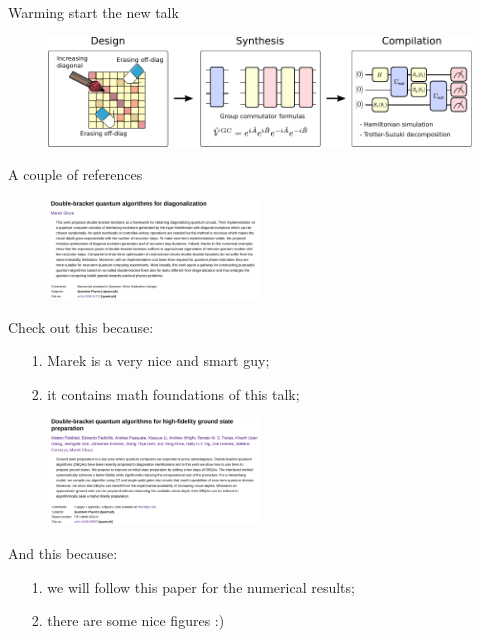 \documentclass[aspectratio=169, 8pt, xcolor={svgnames}]{beamer}
\begin{document}
\begin{frame}{Warming start the new talk}
\begin{figure}
   \includegraphics[width=1\textwidth]{figures/3_phases_dbqa.pdf}
\end{figure}
\end{frame}

\subtitle{\texttt{PART 2:} Interfacing DBQAs with other techniques}
\date{4 December 2024}

\begin{frame}{}
\maketitle
\end{frame}

\begin{frame}{A couple of references}
\begin{multicols}{2}
\begin{figure}
   \includegraphics[width=0.5\textwidth]{figures/dbqa_paper.png}
\end{figure}
Check out this because:
\begin{itemize}[noitemsep]
\item[1.] Marek is a very nice and smart guy;
\item[2.] it contains math foundations of this talk; 
\end{itemize}
\begin{figure}
   \includegraphics[width=0.5\textwidth]{figures/boostvqe_paper.png}
\end{figure}
And this because:
\begin{itemize}[noitemsep]
\item[1.] we will follow this paper for the numerical results;
\item[2.] there are some nice figures :) 
\end{itemize}
\end{multicols}
\end{frame}
\end{document}
